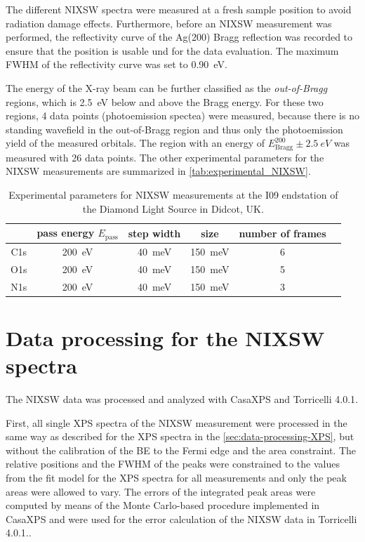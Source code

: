 The different \ac{NIXSW} spectra were measured at a fresh sample position to avoid radiation damage effects. Furthermore, before an \ac{NIXSW} measurement was performed, the reflectivity curve of the Ag(200) Bragg reflection was recorded to ensure that the position is usable und for the data evaluation. The maximum \ac{FWHM} of the reflectivity curve was set to 0.90~\si{eV}. 

The energy of the X-ray beam can be further classified as the \textit{out-of-Bragg} regions, which is 2.5~\si{eV} below and above the Bragg energy. For these two regions, 4 data points (photoemission spectea) were measured, because there is no standing wavefield in the {out-of-Bragg} region and thus only the photoemission yield of the measured orbitals. The region with an energy of $E^{200}_\mathrm{Bragg} \pm 2.5~\si{eV}$ was measured with 26 data points. The other experimental parameters for the \ac{NIXSW} measurements are summarized in \autoref{tab:experimental_NIXSW}. 

\begin{table}[H]
	\centering
	\caption{Experimental parameters for \ac{NIXSW} measurements at the I09 endstation of the Diamond Light Source in Didcot, UK.}
	\begin{tabular}{@{}cccccc@{}} \toprule
		& pass energy $E_\mathrm{pass}$ & step width & size & number of frames\\
		\midrule
		C1s & 200~\si{\eV} & 40~\si{meV} & 150~\si{meV} & 6 \\ 
		O1s & 200~\si{\eV} & 40~\si{meV} & 150~\si{meV} & 5 \\ 	
		N1s & 200~\si{\eV} & 40~\si{meV} & 150~\si{meV} & 3 \\
		\bottomrule
	\end{tabular}
	\label{tab:experimental_NIXSW}
\end{table}



\section{Data processing for the NIXSW spectra}

The \ac{NIXSW} data was processed and analyzed with CasaXPS\autocite{CasaSoftwareLtd2022} and Torricelli 4.0.1.\autocite{Bocquet2019}
 
First, all single \ac{XPS} spectra of the \ac{NIXSW} measurement were processed in the same way as described for the \ac{XPS} spectra in the \autoref{sec:data-processing-XPS}, but without the calibration of the \ac{BE} to the Fermi edge and the area constraint. The relative positions and the \ac{FWHM} of the peaks were constrained to the values from the fit model for the \ac{XPS} spectra for all measurements and only the peak areas were allowed to vary. The errors of the integrated peak areas were computed by means of the Monte Carlo-based procedure implemented in CasaXPS\autocite{CasaSoftwareLtd2022} and were used for the error calculation of the \ac{NIXSW} data in Torricelli 4.0.1.\autocite{Bocquet2019}.

